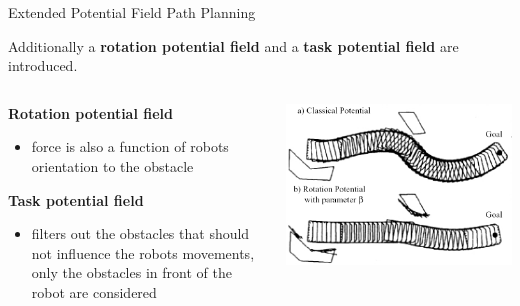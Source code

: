 \documentclass[compress,xcolor=table]{beamer}
\begin{document}
\begin{frame}{Extended Potential Field Path Planning}

    Additionally a \textbf{rotation potential field} and a \textbf{task
    potential field} are introduced.

    \vspace{1em}

    \begin{columns}
        \begin{column}{0.5\linewidth}

            \textbf{Rotation potential field}

            \begin{itemize}
                \item force is also a function of robots orientation to the obstacle
            \end{itemize}

            \textbf{Task potential field}

            \begin{itemize}
                \item filters out the obstacles that should not influence the robots
                    movements, \ie only the obstacles in front of the robot are considered
            \end{itemize}

        \end{column}
        \begin{column}{0.5\linewidth}
            \begin{center}
                \includegraphics[width=\linewidth]{potentialfield}
            \end{center}
        \end{column}
    \end{columns}

\end{frame}
\end{document}
